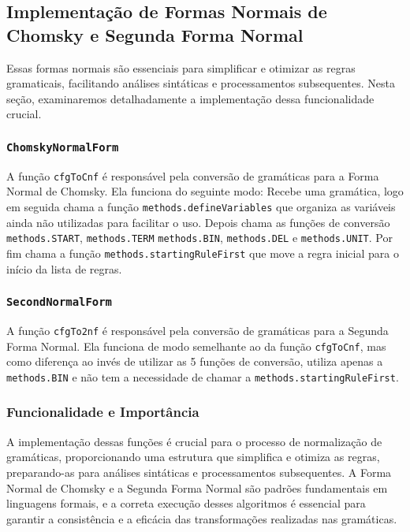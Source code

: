 \documentclass[a4paper,12pt]{article} %
\begin{document}
\subsection{Implementação de Formas Normais de Chomsky e Segunda Forma Normal}

Essas formas normais são essenciais para simplificar e otimizar as regras gramaticais, facilitando análises sintáticas e processamentos subsequentes. Nesta seção, examinaremos detalhadamente a implementação dessa funcionalidade crucial.

\subsubsection{\texttt{ChomskyNormalForm}}

A função \texttt{cfgToCnf} é responsável pela conversão de gramáticas para a Forma Normal de Chomsky. Ela funciona do seguinte modo:
Recebe uma gramática, logo em seguida chama a função \texttt{methods.defineVariables} que organiza as variáveis ainda não utilizadas para facilitar o uso. Depois chama as funções de conversão \texttt{methods.START}, \texttt{methods.TERM} \texttt{methods.BIN}, \texttt{methods.DEL} e \texttt{methods.UNIT}. Por fim chama a função \texttt{methods.startingRuleFirst} que move a regra inicial para o início da lista de regras.

\subsubsection{\texttt{SecondNormalForm}}

A função \texttt{cfgTo2nf} é responsável pela conversão de gramáticas para a Segunda Forma Normal. Ela funciona de modo semelhante ao da função \texttt{cfgToCnf}, mas como diferença ao invés de utilizar as 5 funções de conversão, utiliza apenas a \texttt{methods.BIN} e não tem a necessidade de chamar a \texttt{methods.startingRuleFirst}.

\subsubsection{Funcionalidade e Importância}

A implementação dessas funções é crucial para o processo de normalização de gramáticas, proporcionando uma estrutura que simplifica e otimiza as regras, preparando-as para análises sintáticas e processamentos subsequentes. A Forma Normal de Chomsky e a Segunda Forma Normal são padrões fundamentais em linguagens formais, e a correta execução desses algoritmos é essencial para garantir a consistência e a eficácia das transformações realizadas nas gramáticas.
\end{document}

